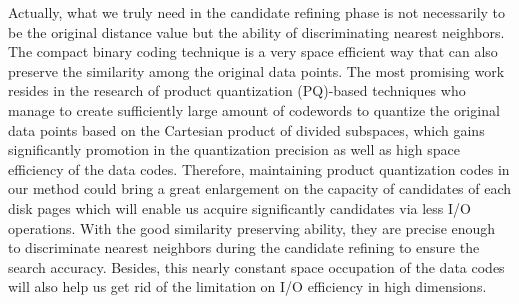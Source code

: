 \documentclass[twocolumn]{svjour3}          %
\begin{document}
Actually, what we truly need in the candidate refining phase is not necessarily to be the original distance value but the ability of discriminating nearest neighbors. 
The compact binary coding technique is a very space efficient way that can also preserve the similarity among the original data points. 
The most promising work resides in the research of product quantization (PQ)-based techniques who manage to create sufficiently large amount of codewords to quantize the original data points based on the Cartesian product of divided subspaces, which gains significantly promotion in the quantization precision as well as high space efficiency of the data codes. 
Therefore, maintaining product quantization codes in our method could bring a great enlargement on the capacity of candidates of each disk pages which will enable us acquire significantly candidates via less I/O operations. With the good similarity preserving ability, they are precise enough to discriminate nearest neighbors during the candidate refining to ensure the search accuracy. Besides, this nearly constant space occupation of the data codes will also help us get rid of the limitation on I/O efficiency in high dimensions.

\end{document}
